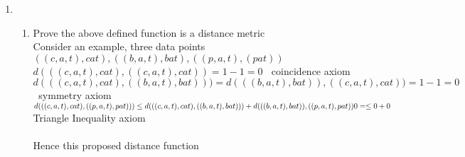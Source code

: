 \documentclass{article}
\begin{document}
\begin{enumerate}
\begin{enumerate}
\begin{enumerate}
\end{enumerate}
\end{enumerate}
\item 
\begin{enumerate}
\begin{eqnarray}
c(x) &=& \left\{\begin{array}{l} 1, \ \ \ if \: concat(set \: x) \: is \: equal \: to \: string \: x\\ 0, \ \ \ ot herwise\end{array}\right. 
\mbox{\rm }\\
d(\mathrm{\bf x},\mathrm{\bf y}) &=& c(x)-c(y) \
\end{eqnarray}
\item Prove the above defined function is a distance metric\\
Consider an example, three data points ${((c,a,t),cat),((b,a,t),bat),((p,a,t),(pat))}$\\
$d(((c,a,t),cat),((c,a,t),cat))=1-1=0$ $\:$ coincidence axiom\\
$d(((c,a,t),cat),((b,a,t),bat)))=d(((b,a,t),bat)),((c,a,t),cat))=1-1=0$ $\:$ symmetry axiom \\
$d(((c,a,t),cat),((p,a,t),pat))) \leq  d(((c,a,t),cat),((b,a,t),bat))) + d(((b,a,t),bat)),((p,a,t),pat))\\ 0 = \leq 0 + 0$ Triangle Inequality axiom \\ \\
Hence this proposed distance function 
\end{enumerate}
\end{enumerate}
\end{document}

